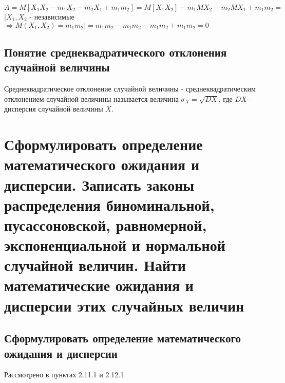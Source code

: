 $A = M[X_{1}X_{2} - m_{1} X_{2} - m_{2} X_{1} + m_{1} m_{2}] = M[X_{1} X_{2}] - m_{1}MX_{2} - m_{2} MX_{1} + m_{1} m_{2} = $ |$X_{1}, X_{2}$  - независимые $\Rightarrow M(X_{1}, X_{2}) = m_{1} m_{2}| = m_{1} m_{2} - m_{1} m_{2} - m_{1}m_{2} + m_{1} m_{2} = 0$\\

\subsection{Понятие среднеквадратического отклонения случайной величины}
Среднеквадратическое отклонение случайной величины - среднеквадратическим отклонением случайной величины называется величина $\sigma_{X} = \sqrt{DX}$, где $DX$ - дисперсия случайной величины $X$.

\section{Сформулировать определение математического ожидания и дисперсии. Записать законы распределения биноминальной, пусассоновской, равномерной, экспоненциальной и нормальной случайной величин. Найти математические ожидания и дисперсии этих случайных величин}
\subsection{Сформулировать определение математического ожидания и дисперсии}
Рассмотрено в пунктах 2.11.1 и 2.12.1

